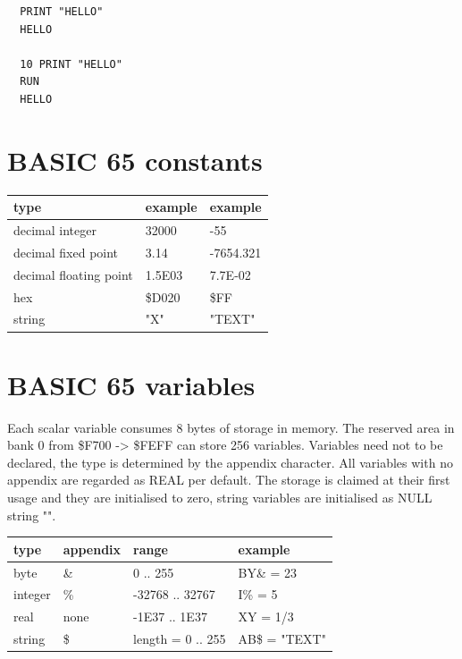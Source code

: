 \begin{tcolorbox}[colback=black,coltext=white]
\verbatimfont{\codefont}
\begin{verbatim}
  PRINT "HELLO"
  HELLO

  10 PRINT "HELLO"
  RUN
  HELLO
\end{verbatim}
\end{tcolorbox}

\newpage
\section{BASIC 65 constants}

{\ttfamily
\setlength{\tabcolsep}{1mm}
\begin{tabular}{|l|l|l|}
\hline
 type                   & example & example \\
\hline
decimal integer         &  32000  & -55       \\
decimal fixed point     &  3.14   & -7654.321 \\
decimal floating point  &  1.5E03 & 7.7E-02   \\
hex                     &  \$D020 & \$FF      \\
string                  & "X"     & "TEXT"    \\
\hline
\end{tabular}
}

\section{BASIC 65 variables}

Each scalar variable consumes 8 bytes of storage in memory.
The reserved area in bank 0 from \$F700 -> \$FEFF can store 256 variables.
Variables need not to be declared, the type is determined by the appendix
character. All variables with no appendix are regarded as REAL per default.
The storage is claimed at their first usage and they are initialised to zero,
string variables are initialised as NULL string "".

{\ttfamily
\setlength{\tabcolsep}{1mm}
\begin{tabular}{|l|l|l|l|}
\hline
 type                   & appendix & range    & example  \\
\hline
byte                    &    \&    & 0 .. 255        & BY\& = 23 \\
integer                 &    \%    & -32768 .. 32767 & I\% = 5    \\
real                    &   none   & -1E37 .. 1E37   & XY = 1/3   \\
string                  &    \$    & length = 0 .. 255 & AB\$ = "TEXT" \\
\hline
\end{tabular}
}


